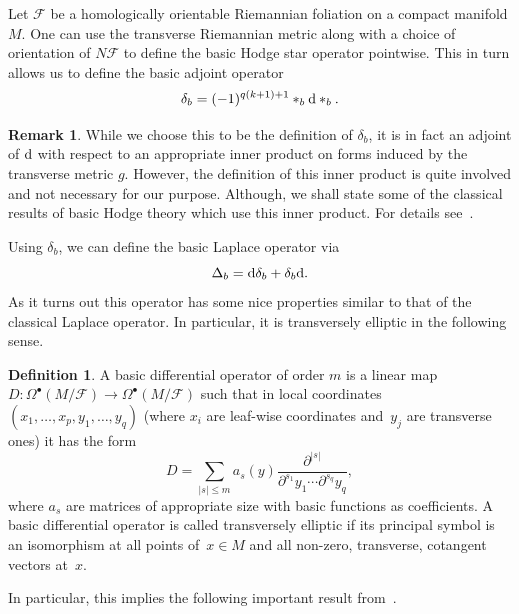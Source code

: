 \documentclass[pdftex]{sigma}
\numberwithin{equation}{section}
\theoremstyle{definition}
\newtheorem{defi}[tw]{Definition}
\newtheorem{rem}[tw]{Remark}
\begin{document}
Let $\mathcal{F}$ be a homologically orientable Riemannian foliation on a compact manifold $M$. One can use the transverse Riemannian metric along with a choice of orientation of $N\mathcal{F}$ to define the basic Hodge star operator  pointwise. This in turn allows us to define the basic adjoint operator
\[\delta_b=(-1)^{q(k+1)+1}*_b{\rm d}*_b.\]
\begin{rem} While we choose this to be the definition of $\delta_b$, it is in fact an adjoint of ${\rm d}$ with respect to an appropriate inner product on forms induced by the transverse metric $g$. However, the definition of this inner product is quite involved and not necessary for our purpose. Although, we shall state some of the classical results of basic Hodge theory which use this inner product. For details see~\cite{E1}.
\end{rem}
Using $\delta_b$, we can define the basic Laplace operator via
\[\Delta_b={\rm d}\delta_b+\delta_b{\rm d}.\]
As it turns out this operator has some nice properties similar to that of the classical Laplace operator. In particular, it is transversely elliptic in the following sense.

\begin{defi}
A basic differential operator of order $m$ is a linear map ${D\colon\! \Omega^{\bullet}(M\slash\!\mathcal{F})\!\rightarrow\!\Omega^{\bullet}(M\slash\!\mathcal{F})}$ such that in local coordinates $(x_1,\dots,x_p,y_1,\dots,y_q)$ (where $x_i$ are leaf-wise coordinates and~$y_j$ are transverse ones) it has the form
\begin{equation*}
D=\sum\limits_{|s|\leq m}a_s(y)\frac{\partial^{|s|}}{\partial^{s_1}y_1\cdots \partial^{s_q}y_q},
\end{equation*}
where $a_s$ are matrices of appropriate size with basic functions as coefficients. A basic differential operator is called transversely elliptic if its principal symbol is an isomorphism at all points of~${x\in M}$ and all non-zero, transverse, cotangent vectors at~$x$.
\end{defi}

In particular, this implies the following important result from~\cite{E1}.
\end{document}
